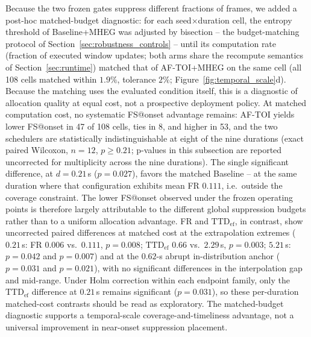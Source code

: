 \documentclass[a4paper,fleqn]{cas-dc}
\begin{document}
{Because the two frozen gates suppress different fractions of frames, we
added a post-hoc matched-budget diagnostic: for each seed$\times$duration
cell, the entropy threshold of Baseline+MHEG was adjusted by bisection --
the budget-matching protocol of Section~\ref{sec:robustness_controls} --
until its computation rate (fraction of executed window updates; both arms
share the recompute semantics of Section~\ref{sec:runtime}) matched that of
\mbox{AF-TOI}+MHEG on the same cell (all 108 cells matched within $1.9\%$, tolerance $2\%$;
Figure~\ref{fig:temporal_scale}d). Because the matching uses the evaluated
condition itself, this is a diagnostic of allocation quality at equal cost,
not a prospective deployment policy. At matched computation cost, no
systematic FS@onset advantage remains: \mbox{AF-TOI} yields lower FS@onset
in 47 of 108 cells, ties in 8, and higher in 53, and the two schedulers are
statistically indistinguishable at eight of the nine durations (exact paired
Wilcoxon, $n{=}12$, $p\ge0.21$; p-values in this subsection are reported
uncorrected for multiplicity across the nine durations). The single significant difference, at
$d=0.21$\,s ($p=0.027$), favors the matched Baseline -- at the same duration
where that configuration exhibits mean FR $0.111$, i.e.\ outside the
coverage constraint. The lower FS@onset observed under the frozen operating
points is therefore largely attributable to the different global suppression
budgets rather than to a uniform allocation advantage. FR and
$\mathrm{TTD}_{\mathrm{ef}}$, in contrast, show uncorrected paired differences
at matched cost at the extrapolation extremes ($0.21$\,s: FR $0.006$ vs.\
$0.111$, $p=0.008$; $\mathrm{TTD}_{\mathrm{ef}}$ $0.66$ vs.\ $2.29$\,s,
$p=0.003$; $5.21$\,s: $p=0.042$ and $p=0.007$) and at the $0.62$-s abrupt
in-distribution anchor ($p=0.031$ and $p=0.021$), with no significant
differences in the interpolation gap and mid-range. Under Holm correction
within each endpoint family, only the $\mathrm{TTD}_{\mathrm{ef}}$ difference
at $0.21$\,s remains significant ($p=0.031$), so these per-duration
matched-cost contrasts should be read as exploratory. The matched-budget
diagnostic supports a temporal-scale coverage-and-timeliness
advantage, not a universal improvement in near-onset suppression placement.

}
\end{document}
